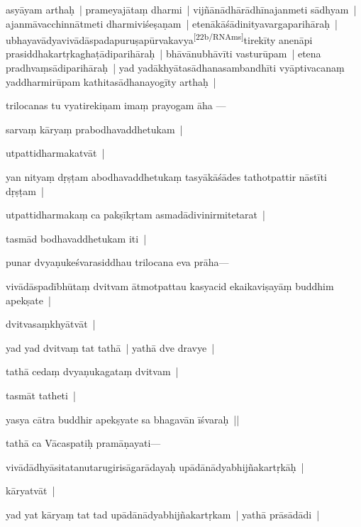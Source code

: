 \documentclass[article,a4paper]{memoir}
\newcommand{\persName}[1]{#1}
\begin{document}
	  \pstart asyā\-yam arthaḥ | prameyajā\-taṃ dharmi | vijñā\-nā\-dhā\-rā\-dhī\-najanmeti sā\-dhyam | ajanmā\-vacchinnā\-tmeti dharmiviśeṣaṇam | etenā\-kā\-śā\-dinityavargaparihā\-raḥ | ubhayavā\-dyavivā\-dā\-spadapuruṣapū\-rvakavya\leavevmode\textsuperscript{\rmlatinfont\tiny [22b/RNAms]}\label{RNAms_22b}tirekī\-ty anenā\-pi prasiddhakartṛkaghaṭā\-diparihā\-raḥ | bhā\-vā\-nubhā\-vī\-ti vasturū\-pam | etena pradhvaṃsā\-diparihā\-raḥ | yad yadā\-khyā\-tasā\-dhanasambandhī\-ti vyā\-ptivacanaṃ yaddharmirū\-pam kathitasā\-dhanayogī\-ty arthaḥ |
	\pend
      

	  \pstart \label{sarit__ratnakīrtinibandhāvali__104795}\persName{trilocanas} tu vyatirekiṇam imaṃ prayogam ā\-ha —
	\pend
      

	  \pstart sarvaṃ kā\-ryaṃ prabodhavaddhetukam |
	\pend
      

	  \pstart utpattidharmakatvā\-t |
	\pend
      

	  \pstart yan nityaṃ dṛṣṭam abodhavaddhetukaṃ tasyā\-kā\-śā\-des tathotpattir nā\-stī\-ti dṛṣṭam |
	\pend
      

	  \pstart utpattidharmakaṃ ca pakṣī\-kṛtam asmadā\-divinirmitetarat |
	\pend
      

	  \pstart tasmā\-d bodhavaddhetukam iti |\label{sarit__ratnakīrtinibandhāvali__105213}
	\pend
      

	  \pstart punar dvyaṇukeśvarasiddhau \persName{trilocana} eva prā\-ha—
	\pend
      

	  \pstart vivā\-dā\-spadī\-bhū\-taṃ dvitvam ā\-tmotpattau kasyacid ekaikaviṣayā\-ṃ buddhim apekṣate |
	\pend
      

	  \pstart dvitvasaṃkhyā\-tvā\-t |
	\pend
      

	  \pstart yad yad dvitvaṃ tat tathā\- | yathā\- dve dravye |
	\pend
      

	  \pstart tathā\- cedaṃ dvyaṇukagataṃ dvitvam |
	\pend
      

	  \pstart tasmā\-t tatheti |
	\pend
      

	  \pstart yasya cā\-tra buddhir apekṣyate sa bhagavā\-n ī\-śvaraḥ ||
	\pend
      

	  \pstart tathā\- ca Vā\-caspatiḥ pramā\-ṇayati—
	\pend
      

	  \pstart vivā\-dā\-dhyā\-sitatanutarugirisā\-garā\-dayaḥ upā\-dā\-nā\-dyabhijñakartṛkā\-ḥ |
	\pend
      

	  \pstart kā\-ryatvā\-t |
	\pend
      

	  \pstart yad yat kā\-ryaṃ tat tad upā\-dā\-nā\-dyabhijñakartṛkam | yathā\- prā\-sā\-dā\-di |
	\pend
      
\end{document}
